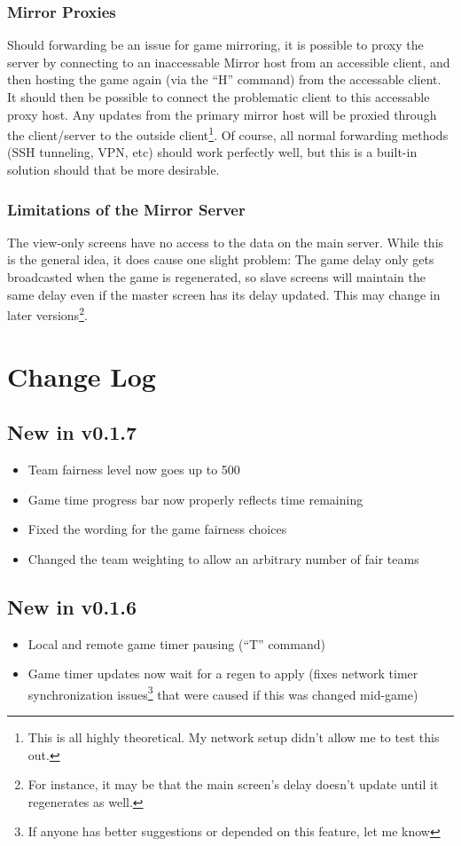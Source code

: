 \documentclass[10pt,a4paper]{report}
\begin{document}
\subsection{Mirror Proxies}
Should forwarding be an issue for game mirroring, it is possible to proxy the server by connecting to an inaccessable Mirror host from an accessible client, and then hosting the game again (via the ``H'' command) from the accessable client.  It should then be possible to connect the problematic client to this accessable proxy host.  Any updates from the primary mirror host will be proxied through the client/server to the outside client\footnote{This is all highly theoretical.  My network setup didn't allow me to test this out.}.  Of course, all normal forwarding methods (SSH tunneling, VPN, etc) should work perfectly well, but this is a built-in solution should that be more desirable.

\subsection{Limitations of the Mirror Server}
The view-only screens have no access to the data on the main server.  While this is the general idea, it does cause one slight problem:  The game delay only gets broadcasted when the game is regenerated, so slave screens will maintain the same delay even if the master screen has its delay updated.  This may change in later versions\footnote{For instance, it may be that the main screen's delay doesn't update until it regenerates as well.}.

\chapter{Change Log}
\section{New in v0.1.7}
\begin{itemize}
\item Team fairness level now goes up to 500
\item Game time progress bar now properly reflects time remaining
\item Fixed the wording for the game fairness choices
\item Changed the team weighting to allow an arbitrary number of fair teams
\end{itemize}
\section{New in v0.1.6}
\begin{itemize}
\item Local and remote game timer pausing (``T'' command)
\item Game timer updates now wait for a regen to apply (fixes network timer synchronization issues\footnote{If anyone has better suggestions or depended on this feature, let me know} that were caused if this was changed mid-game)
\end{itemize}
\end{document}
